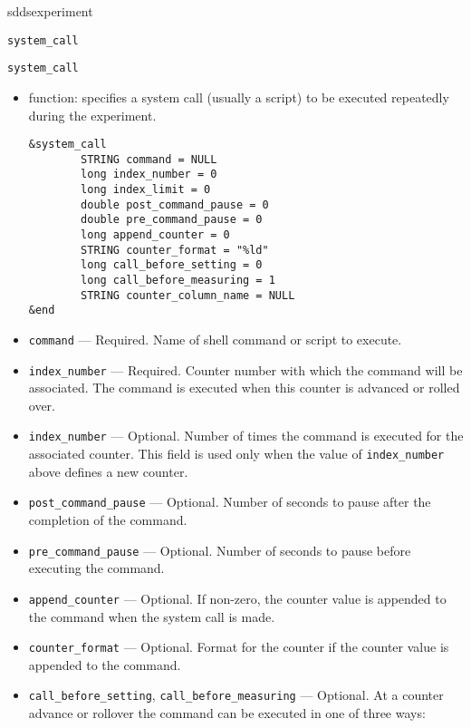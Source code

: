 \begin{sddsprog}{sddsexperiment}
\begin{itemize}
\begin{latexonly}
\newpage\begin{center}{\Large \verb+system_call+}\end{center}
\end{latexonly}
\begin{htmlonly}
  \item {\Large \verb+system_call+}
\end{htmlonly}
  \begin{itemize}
    \item function: specifies a system call (usually a script) to be executed repeatedly during the experiment.
\begin{verbatim}
&system_call
        STRING command = NULL
        long index_number = 0
        long index_limit = 0
        double post_command_pause = 0
        double pre_command_pause = 0
        long append_counter = 0
        STRING counter_format = "%ld"
        long call_before_setting = 0
        long call_before_measuring = 1
        STRING counter_column_name = NULL
&end
\end{verbatim}
    \item {\verb+command+} --- Required. Name of shell command or script to execute.
    \item {\verb+index_number+} --- Required. Counter number with which the command will be associated. The command is executed
                when this counter is advanced or rolled over.
    \item {\verb+index_number+} --- Optional. Number of times the command is executed for
                the associated counter. This field is used only when the value of {\verb+index_number+} above defines a new counter.
    \item {\verb+post_command_pause+} --- Optional. Number of seconds to pause after the completion of the command.
    \item {\verb+pre_command_pause+} --- Optional. Number of seconds to pause before executing the command.
    \item {\verb+append_counter+} --- Optional. If non-zero, the counter value is appended to the command when the
                system call is made.
    \item {\verb+counter_format+} --- Optional. Format for the counter if the counter value is appended to the command.
    \item {\verb+call_before_setting+}, {\verb+call_before_measuring+} --- Optional.
                At a counter advance or rollover the command can be executed in one of three ways:

\end{itemize}
\end{itemize}
\end{sddsprog}
